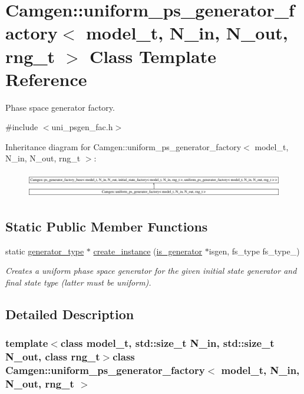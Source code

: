 \hypertarget{a00565}{}\section{Camgen\+:\+:uniform\+\_\+ps\+\_\+generator\+\_\+factory$<$ model\+\_\+t, N\+\_\+in, N\+\_\+out, rng\+\_\+t $>$ Class Template Reference}
\label{a00565}


Phase space generator factory.  




{\ttfamily \#include $<$uni\+\_\+psgen\+\_\+fac.\+h$>$}

Inheritance diagram for Camgen\+:\+:uniform\+\_\+ps\+\_\+generator\+\_\+factory$<$ model\+\_\+t, N\+\_\+in, N\+\_\+out, rng\+\_\+t $>$\+:\begin{figure}[H]
\begin{center}
\leavevmode
\includegraphics[height=1.129032cm]{a00565}
\end{center}
\end{figure}
\subsection*{Static Public Member Functions}
\begin{DoxyCompactItemize}
\item 
static \hyperlink{a00450}{generator\+\_\+type} $\ast$ \hyperlink{a00565_ac7576672e64e015fc2cf210f892068b7}{create\+\_\+instance} (\hyperlink{a00308}{is\+\_\+generator} $\ast$isgen, fs\+\_\+type fs\+\_\+type\+\_\+)
\begin{DoxyCompactList}\small\item\em Creates a uniform phase space generator for the given initial state generator and final state type (latter must be uniform). \end{DoxyCompactList}\end{DoxyCompactItemize}


\subsection{Detailed Description}
\subsubsection*{template$<$class model\+\_\+t, std\+::size\+\_\+t N\+\_\+in, std\+::size\+\_\+t N\+\_\+out, class rng\+\_\+t$>$class Camgen\+::uniform\+\_\+ps\+\_\+generator\+\_\+factory$<$ model\+\_\+t, N\+\_\+in, N\+\_\+out, rng\+\_\+t $>$}


